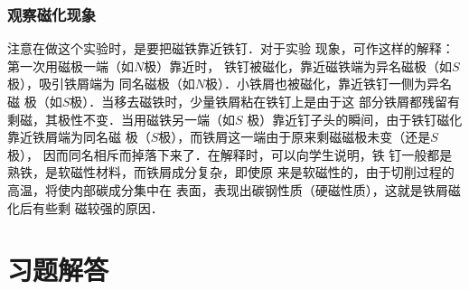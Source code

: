 \subsubsection{观察磁化现象}
注意在做这个实验时，是要把磁铁靠近铁钉．对于实验
现象，可作这样的解释：第一次用磁极一端（如$N$极）靠近时，
铁钉被磁化，靠近磁铁端为异名磁极（如$S$极），吸引铁屑端为
同名磁极（如$N$极）．小铁屑也被磁化，靠近铁钉一侧为异名磁
极（如$S$极）．当移去磁铁时，少量铁屑粘在铁钉上是由于这
部分铁屑都残留有剩磁，其极性不变．当用磁铁另一端（如$S$
极）靠近钉子头的瞬间，由于铁钉磁化靠近铁屑端为同名磁
极（$S$极），而铁屑这一端由于原来剩磁磁极未变（还是$S$极），
因而同名相斥而掉落下来了．在解释时，可以向学生说明，铁
钉一般都是熟铁，是软磁性材料，而铁屑成分复杂，即使原
来是软磁性的，由于切削过程的高温，将使内部碳成分集中在
表面，表现出碳钢性质（硬磁性质），这就是铁屑磁化后有些剩
磁较强的原因．

\section{习题解答}
